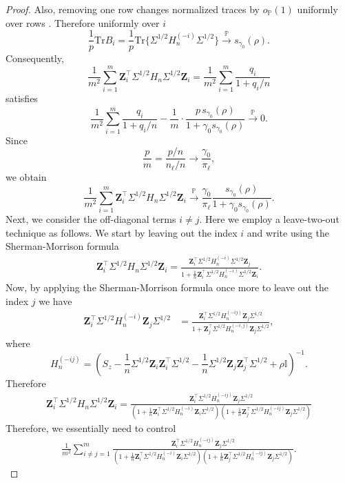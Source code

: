 \documentclass{article}
\theoremstyle{plain}
\theoremstyle{remark}
\def \bZ{\mathbf{Z}}
\def \tr {\mathrm{Tr}}
\def \I{\mathcal{I}}
\def \P{\mathbb{P}}
\def \bZ {{\boldsymbol{Z}}}
\def \I {\mathbb{I}}
\begin{document}
\begin{proof}
Also, removing one row changes normalized traces by \(o_{\P}(1)\) uniformly over rows \citep[Theorem A.43]{bai2010spectral}. Therefore uniformly over $i$
\[
\frac1p\tr B_i
=
\frac1p\tr\{\Sigma^{1/2}H_n^{(-i)}\Sigma^{1/2}\}
\stackrel{\P}{\to}
s_{\gamma_0}(\rho).
\]
Consequently,
\[
\frac1{m^2}
\sum_{i=1}^m
\bZ_i^\top\Sigma^{1/2}H_n\Sigma^{1/2}\bZ_i
=
\frac1{m^2}
\sum_{i=1}^m
\frac{q_i}{1+q_i/n}
\]
satisfies
\[
\frac1{m^2}
\sum_{i=1}^m
\frac{q_i}{1+q_i/n}
-
\frac1m
\cdot
\frac{p\,s_{\gamma_0}(\rho)}
{1+\gamma_0s_{\gamma_0}(\rho)}\stackrel{\P}{\to} 0.
\]
Since
\[
\frac pm
=
\frac{p/n}{n_\ell/n}
\to
\frac{\gamma_0}{\pi_\ell},
\]
we obtain
\[
\frac1{m^2}
\sum_{i=1}^m
\bZ_i^\top\Sigma^{1/2}H_n\Sigma^{1/2}\bZ_i
\stackrel{\P}{\to}
\frac{\gamma_0}{\pi_\ell}
\frac{s_{\gamma_0}(\rho)}
{1+\gamma_0s_{\gamma_0}(\rho)}.
\]
Next, we consider the off-diagonal terms \(i\ne j\). Here we employ a leave-two-out technique as follows. We start by leaving out the index $i$ and write using the Sherman-Morrison formula
\begin{align*}
\bZ_i^\top\Sigma^{1/2}H_n\Sigma^{1/2}\bZ_i=\frac{\bZ_i^\top \Sigma^{1/2}H_n^{(-i)}\Sigma^{1/2}\bZ_j}{1+\frac{1}{n}\bZ_i^\top\Sigma^{1/2} H_n^{(-i)}\Sigma^{1/2}\bZ_i}.
\end{align*}
Now, by applying the Sherman-Morrison formula once more to leave out the index $j$ we have
\begin{align*}
  \bZ_i^\top\Sigma^{1/2} H_n^{(-i)}\bZ_j\Sigma^{1/2}&=\frac{\bZ_i^\top\Sigma^{1/2} H_n^{(-ij)}\bZ_j\Sigma^{1/2}}{1+\bZ_j^\top \Sigma^{1/2}H_n^{(-i,j)}\bZ_j\Sigma^{1/2}}, 
\end{align*}
where
\[
H_n^{(-ij)}
=
\left(
S_z-\frac1n\Sigma^{1/2}\bZ_i\bZ_i^\top\Sigma^{1/2}-\frac1n\Sigma^{1/2}\bZ_j\bZ_j^\top\Sigma^{1/2}
+\rho \I
\right)^{-1}.
\]
Therefore
\begin{align*}
    \bZ_i^\top\Sigma^{1/2}H_n\Sigma^{1/2}\bZ_i=\frac{\bZ_i^\top\Sigma^{1/2} H_n^{(-ij)}\bZ_j\Sigma^{1/2}}{(1+\frac{1}{n}\bZ_i^\top\Sigma^{1/2} H_n^{(-i)}\bZ_i\Sigma^{1/2})(1+\frac{1}{n}\bZ_j^\top\Sigma^{1/2} H_n^{(-ij)}\bZ_j\Sigma^{1/2})}
\end{align*}
Therefore, we essentially need to control
\begin{align*}
    \frac{1}{m^2}\sum\limits_{i\neq j=1}^m \frac{\bZ_i^\top\Sigma^{1/2} H_n^{(-ij)}\bZ_j\Sigma^{1/2}}{(1+\frac{1}{n}\bZ_i^\top\Sigma^{1/2} H_n^{(-i)}\bZ_i\Sigma^{1/2})(1+\frac{1}{n}\bZ_j^\top\Sigma^{1/2} H_n^{(-ij)}\bZ_j\Sigma^{1/2})}.
\end{align*}

\end{proof}
\end{document}
